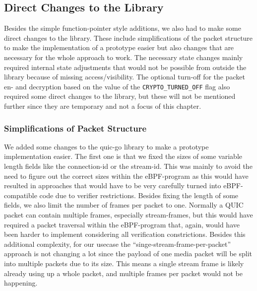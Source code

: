 \subsection{Direct Changes to the Library}

Besides the simple function-pointer style additions, we also had to make some direct changes to the library.
These include simplifications of the packet structure to make the implementation of a prototype easier 
but also changes that are necessary for the whole approach to work.
The necessary state changes mainly required internal state adjustments that would not be possible from outside 
the library because of missing access/visibility.
The optional turn-off for the packet en- and decryption based on the value of the \verb|CRYPTO_TURNED_OFF| flag
also required some direct changes to the library, but these will not be mentioned further since they are temporary
and not a focus of this chapter.

\subsubsection*{Simplifications of Packet Structure}
We added some changes to the quic-go library to make a prototype implementation easier.
The first one is that we fixed the sizes of some variable length fields like the connection-id or the stream-id.
This was mainly to avoid the need to figure out the correct sizes within the eBPF-program as this would have 
resulted in approaches that would have to be very carefully turned into eBPF-compatible code due to verifier
restrictions.
Besides fixing the length of some fields, we also limit the number of frames per packet to one.
Normally a QUIC packet can contain multiple frames, especially stream-frames, but this would have required 
a packet traversal within the eBPF-program that, again, would have been harder to implement considering all
verification constrictions.
Besides this additional complexity, for our usecase the ``singe-stream-frame-per-packet'' approach is not changing
a lot since the payload of one media packet will be split into multiple packets due to its size.
This means a single stream frame is likely already using up a whole packet, and multiple frames per packet would 
not be happening.

